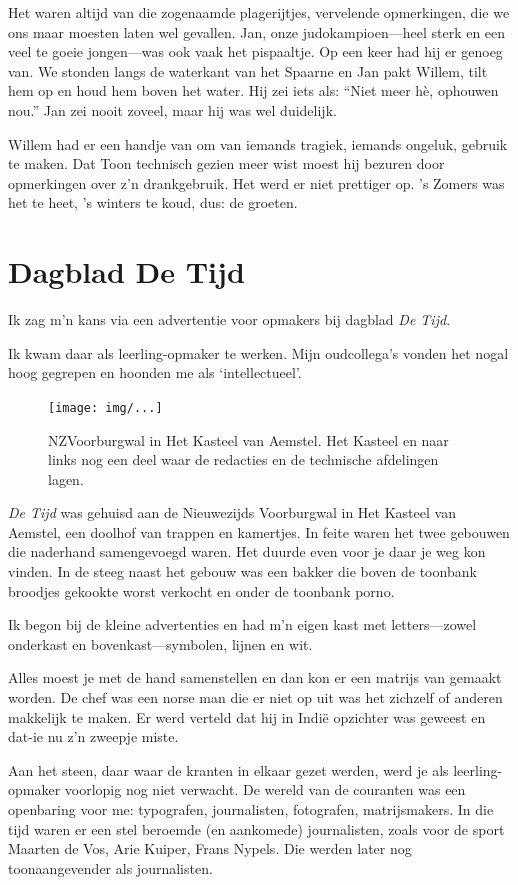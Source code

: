 \documentclass[12pt,twoside]{memoir}
\begin{document}
Het waren altijd van die zogenaamde plagerijtjes, vervelende opmerkingen, die we ons maar moesten laten wel gevallen. Jan, onze judokampioen---heel sterk en een veel te goeie jongen---was ook vaak het pispaaltje. Op een keer had hij er genoeg van. We stonden langs de waterkant van het Spaarne en Jan pakt Willem, tilt hem op en houd hem boven het water. Hij zei iets als: ``Niet meer hè, ophouwen nou.'' Jan zei nooit zoveel, maar hij was wel duidelijk.

Willem had er een handje van om van iemands tragiek, iemands ongeluk, gebruik te maken. Dat Toon technisch gezien meer wist moest hij bezuren door opmerkingen over z’n drankgebruik. Het werd er niet prettiger op. ’s Zomers was het te heet, ’s winters te koud, dus: de groeten.

\chapter{Dagblad De Tijd} %
\label{cha:detijd}

Ik zag m’n kans via een advertentie voor opmakers bij dagblad \emph{De Tijd}.

Ik kwam daar als leerling-opmaker te werken. Mijn oudcollega’s vonden het nogal hoog gegrepen en hoonden me als `intellectueel'.

\begin{figure}[t]
\texttt{[image: img/...]}
\caption{NZVoorburgwal in Het Kasteel van Aemstel. Het Kasteel en naar links nog een deel waar de redacties en de technische afdelingen lagen.}
\end{figure}

\emph{De Tijd} was gehuisd aan de Nieuwezijds Voorburgwal in Het Kasteel van Aemstel, een doolhof van trappen en kamertjes. In feite waren het twee gebouwen die naderhand samengevoegd waren. Het duurde even voor je daar je weg kon vinden. In de steeg naast het gebouw was een bakker die boven de toonbank broodjes gekookte worst verkocht en onder de toonbank porno. 

Ik begon bij de kleine advertenties en had m'n eigen kast met letters---zowel onderkast en bovenkast---symbolen, lijnen en wit.

Alles moest je met de hand samenstellen en dan kon er een matrijs van gemaakt worden. De chef was een norse man die er niet op uit was het zichzelf of anderen makkelijk te maken. Er werd verteld dat hij in Indië opzichter was geweest en dat-ie nu z'n zweepje miste.

Aan het steen, daar waar de kranten in elkaar gezet werden, werd je als leerling-opmaker voorlopig nog niet verwacht. De wereld van de couranten was een openbaring voor me: typografen, journalisten, fotografen, matrijsmakers. In die tijd waren er een stel beroemde (en aankomede) journalisten, zoals voor de sport Maarten de Vos, Arie Kuiper, Frans Nypels. Die werden later nog toonaangevender als journalisten. 
\end{document}
